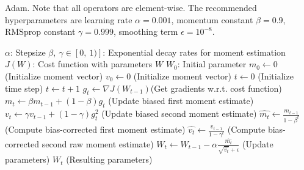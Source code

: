 \begin{algorithm}
    \caption{Adam. Note that all operators are element-wise. The recommended
    hyperparameters are learning rate $ \alpha = 0.001 $, momentum 
    constant $ \beta = 0.9 $, RMSprop constant $ \gamma = 0.999 $, 
    smoothing term $ \epsilon = 10^{-8} $.}
    \label{alg:Adam}
    \begin{algorithmic}
    \REQUIRE $\alpha$: Stepsize
    \REQUIRE $\beta,\ \gamma \in [0,\ 1)]$: Exponential decay rates 
                for moment estimation
    \REQUIRE $J(W)$: Cost function with parameters $ W $
    \REQUIRE $W_0$: Initial parameter
    \STATE $m_0 \gets 0$ (Initialize  moment vector)
    \STATE $v_0 \gets 0$ (Initialize  moment vector)
    \STATE $t \gets 0$ (Initialize time step)
    \STATE $ t \gets t + 1 $ 
    \STATE $ g_t \gets \nabla J(W_{t-1}) $(Get gradients w.r.t. cost function)
    \STATE $ m_t \gets \beta m_{t-1} + (1-\beta)g_t $ (Update biased first moment estimate)
    \STATE $ v_t \gets \gamma v_{t-1} + (1-\gamma)g_t^2 $ (Update biased second moment estimate)
    \STATE $ \hat{m_t} \gets \frac{m_{t-1}}{1-\beta^t}$ (Compute bias-corrected first moment estimate)
    \STATE $ \hat{v_t} \gets \frac{v_{t-1}}{1-\gamma^t} $ (Compute bias-corrected second raw moment estimate)
    \STATE $ W_t \gets W_{t-1} - \alpha \frac{\hat{m_t}}{\sqrt{\hat{v_t}}+\epsilon} $ (Update parameters)
    \ENDWHILE
    \RETURN $ W_t $ (Resulting parameters)
    \end{algorithmic}
\end{algorithm}

